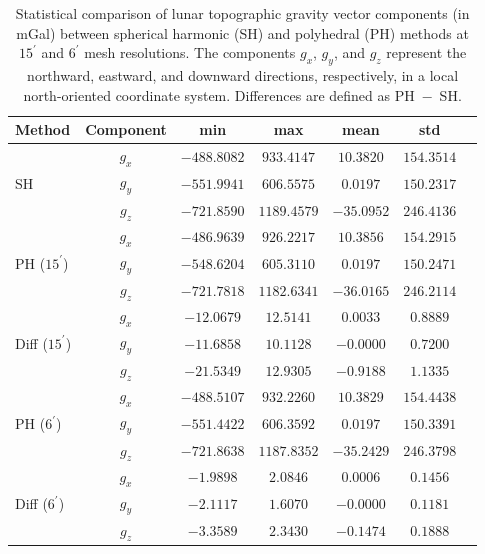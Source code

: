 \begin{table}[h!]
\centering
\caption{Statistical comparison of lunar topographic gravity vector components (in mGal) between spherical harmonic (SH) and polyhedral (PH) methods at $15^{\prime}$ and $6^{\prime}$ mesh resolutions. The components $g_x$, $g_y$, and $g_z$ represent the northward, eastward, and downward directions, respectively, in a local north-oriented coordinate system. Differences are defined as PH~$-$~SH.}
\label{tab:Moon_SH_PH_comparison}
\begin{tabular}{lcccccc}
\toprule
Method & Component & min & max & mean & std \\
\midrule
\multirow{3}{*}{SH} 
   & $g_x$ & $-488.8082$ & $933.4147$ & $10.3820$ & $154.3514$ \\
   & $g_y$ & $-551.9941$ & $606.5575$ & $0.0197$  & $150.2317$ \\
   & $g_z$ & $-721.8590$ & $1189.4579$ & $-35.0952$ & $246.4136$ \\
\midrule
\multirow{3}{*}{PH ($15^{\prime}$)} 
   & $g_x$ & $-486.9639$ & $926.2217$ & $10.3856$ & $154.2915$ \\
   & $g_y$ & $-548.6204$ & $605.3110$ & $0.0197$  & $150.2471$ \\
   & $g_z$ & $-721.7818$ & $1182.6341$ & $-36.0165$ & $246.2114$ \\
\midrule
\multirow{3}{*}{Diff ($15^{\prime}$)} 
   & $g_x$ & $-12.0679$ & $12.5141$ & $0.0033$ & $0.8889$ \\
   & $g_y$ & $-11.6858$ & $10.1128$ & $-0.0000$ & $0.7200$ \\
   & $g_z$ & $-21.5349$ & $12.9305$ & $-0.9188$ & $1.1335$ \\
\midrule
\multirow{3}{*}{PH ($6^{\prime}$)} 
   & $g_x$ & $-488.5107$ & $932.2260$ & $10.3829$ & $154.4438$ \\
   & $g_y$ & $-551.4422$ & $606.3592$ & $0.0197$  & $150.3391$ \\
   & $g_z$ & $-721.8638$ & $1187.8352$ & $-35.2429$ & $246.3798$ \\
\midrule
\multirow{3}{*}{Diff ($6^{\prime}$)} 
   & $g_x$ & $-1.9898$ & $2.0846$ & $0.0006$ & $0.1456$ \\
   & $g_y$ & $-2.1117$ & $1.6070$ & $-0.0000$ & $0.1181$ \\
   & $g_z$ & $-3.3589$ & $2.3430$ & $-0.1474$ & $0.1888$ \\
\bottomrule
\end{tabular}
\end{table}